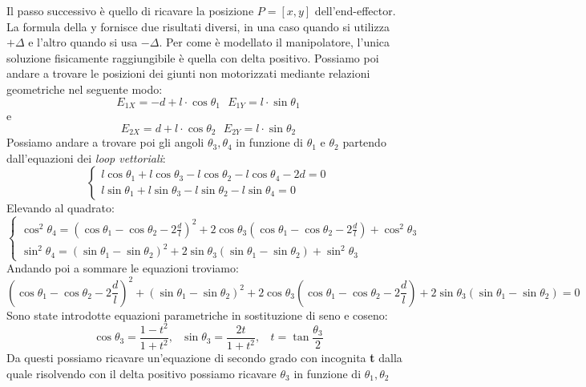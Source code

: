 Il passo successivo è quello di ricavare la posizione $P=[x,y]$ dell'end-effector. La formula della y fornisce due risultati diversi, in una caso quando si utilizza $+\Delta$ e l'altro quando si usa $-\Delta$. Per come è modellato il manipolatore, l'unica soluzione fisicamente raggiungibile è quella con delta positivo. 
Possiamo poi andare a trovare le posizioni dei giunti non motorizzati mediante relazioni geometriche nel seguente modo: 
\begin{equation*}
    E_{1X} = -d+l\cdot \cos\theta_1 \ \ \  E_{1Y}=l\cdot \sin\theta_1
\end{equation*}
e
\begin{equation*}
    E_{2X} = d+ l\cdot \cos\theta_2 \ \ \  E_{2Y} = l\cdot \sin\theta_2
\end{equation*}
Possiamo andare a trovare poi gli angoli $\theta_3 , \theta_4$ in funzione di $\theta_1$ e $\theta_2$ partendo dall'equazioni dei \textit{loop vettoriali}:
\begin{equation}
	\begin{cases}
		l\cos\theta_1 + l\cos\theta_3 - l\cos\theta_2 -l\cos\theta_4 -2d = 0 \\
		l\sin\theta_1 +l\sin\theta_3 - l\sin\theta_2 -l\sin\theta_4 = 0
	\end{cases}
\label{eq:loopVettoriali}
\end{equation}
Elevando al quadrato:
\begin{equation*}
	\begin{cases}
	\cos^2\theta_4 = (\cos\theta_1-\cos\theta_2-2\frac{d}{l})^2 + 2\cos\theta_3(\cos\theta_1-\cos\theta_2-2\frac{d}{l}) +\cos^2\theta_3 \\
			\sin^2\theta_4 = (\sin\theta_1-\sin\theta_2)^2 + 2\sin\theta_3(\sin\theta_1-\sin\theta_2) +\sin^2\theta_3 
	\end{cases}
\end{equation*}
Andando poi a sommare le equazioni troviamo:
\begin{equation*}
	(\cos\theta_1-\cos\theta_2-2\frac{d}{l})^2+ (\sin\theta_1-\sin\theta_2)^2+ 2\cos\theta_3(\cos\theta_1-\cos\theta_2-2\frac{d}{l})+ 2\sin\theta_3(\sin\theta_1-\sin\theta_2) = 0
\end{equation*}
Sono state introdotte equazioni parametriche in sostituzione di seno e coseno:
\begin{equation*}
	\cos\theta_3 = \frac{1-t^2}{1+t^2},\ \ \ \sin\theta_3 = \frac{2t}{1+t^2}, \ \ \ \  t =\tan\frac{\theta_3}{2}
\end{equation*}
Da questi possiamo ricavare un'equazione di secondo grado con incognita \textbf{t} dalla quale risolvendo con il delta positivo possiamo ricavare $\theta_3$ in funzione di $\theta_1,\theta_2$
